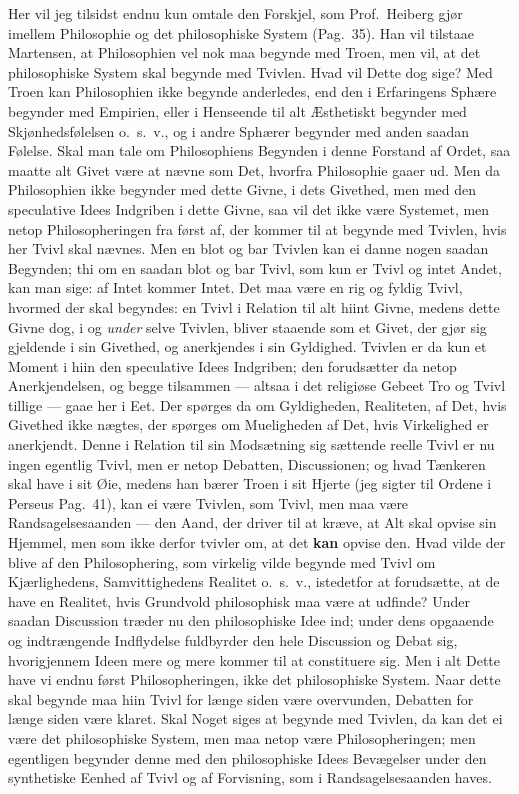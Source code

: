 \documentclass[12pt,a4paper]{book}
\newcommand{\apage}[1]{\marginnote{\footnotesize\textit{[#1]}}}
\begin{document}
Her vil jeg tilsidst endnu kun omtale den Forskjel, som Prof.\ Heiberg
gjør imellem Philosophie og det philosophiske System (Pag.\ 35). Han
vil tilstaae Martensen, at Philosophien vel nok maa begynde med Troen,
men vil, at det philosophiske System skal begynde med Tvivlen. Hvad vil
Dette dog sige? Med Troen kan Philosophien ikke begynde anderledes, end
den i Erfaringens Sphære begynder med Empirien, eller i Henseende til
alt Æsthetiskt begynder med Skjønhedsfølelsen o.\ s.\ v., og i andre
Sphærer begynder med anden saadan Følelse. Skal man tale om
Philosophiens Begynden i denne Forstand af Ordet, saa maatte alt Givet
være at nævne som Det, hvorfra Philosophie gaaer ud. Men da
Philosophien ikke begynder med dette Givne, i dets Givethed, men med
den speculative Idees Indgriben i dette Givne, saa vil det ikke være
Systemet, men netop Philosopheringen fra først af, der kommer til at
begynde med Tvivlen, hvis her Tvivl skal nævnes. Men en blot og bar
Tvivlen kan ei danne nogen saadan Begynden; thi om en saadan blot og
bar Tvivl, som kun er Tvivl og intet Andet, kan man sige: af Intet
kommer Intet. Det maa være en rig og fyldig Tvivl, hvormed der skal
begyndes: en Tvivl i Relation til alt hiint Givne, medens dette Givne
dog, i og \emph{under} selve Tvivlen, bliver staaende som et Givet, der gjør
sig gjeldende i sin Givethed, og anerkjendes i sin Gyldighed. Tvivlen
er da kun et Moment i hiin den speculative Idees Indgriben; den
forudsætter da netop Anerkjendelsen, og begge tilsammen --- altsaa i
det religiøse Gebeet Tro og Tvivl tillige --- gaae her i Eet. Der
spørges da om Gyldigheden, Realiteten, af Det, hvis Givethed ikke
nægtes, der spørges om \apage{65} Mueligheden af Det, hvis Virkelighed er
anerkjendt. Denne i Relation til sin Modsætning sig sættende reelle
Tvivl er nu ingen egentlig Tvivl, men er netop Debatten, Discussionen;
og hvad Tænkeren skal have i sit Øie, medens han bærer Troen i sit
Hjerte (jeg sigter til Ordene i Perseus Pag.\ 41), kan ei være Tvivlen,
som Tvivl, men maa være Randsagelsesaanden --- den Aand, der driver til
at kræve, at Alt skal opvise sin Hjemmel, men som ikke derfor tvivler
om, at det \textbf{kan} opvise den. Hvad vilde der blive af den
Philosophering, som virkelig vilde begynde med Tvivl om Kjærlighedens,
Samvittighedens Realitet o.\ s.\ v., istedetfor at forudsætte, at de
have en Realitet, hvis Grundvold philosophisk maa være at udfinde?
Under saadan Discussion træder nu den philosophiske Idee ind; under
dens opgaaende og indtrængende Indflydelse fuldbyrder den hele
Discussion og Debat sig, hvorigjennem Ideen mere og mere kommer til at
constituere sig. Men i alt Dette have vi endnu først Philosopheringen,
ikke det philosophiske System. Naar dette skal begynde maa hiin Tvivl
for længe siden være overvunden, Debatten for længe siden være klaret.
Skal Noget siges at begynde med Tvivlen, da kan det ei være det
philosophiske System, men maa netop være Philosopheringen; men
egentligen begynder denne med den philosophiske Idees Bevægelser under
den synthetiske Eenhed af Tvivl og af Forvisning, som i
Randsagelsesaanden haves.
\end{document}
